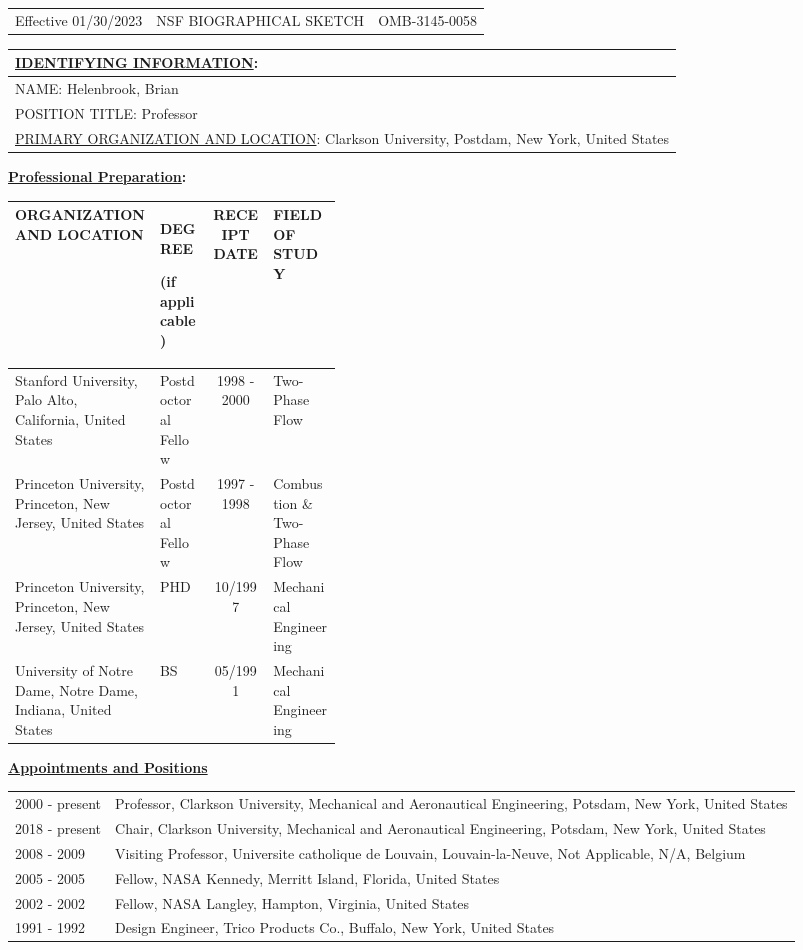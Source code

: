 \documentclass[11pt]{article}
\begin{document}
\begin{tabularx}{\textwidth}{@{\hspace{0pt}}>{\raggedright\arraybackslash}X >{\centering\arraybackslash}X >{\raggedleft\arraybackslash}X}
\tiny Effective 01/30/2023 & \tiny NSF BIOGRAPHICAL SKETCH &\tiny OMB-3145-0058
\end{tabularx}
\vspace{-0.8\baselineskip}
\begin{tabularx}{\linewidth}{@{\hspace{0pt}}X}
{\bf \underline{IDENTIFYING INFORMATION}:} \\ \hline
NAME: Helenbrook, Brian \\ \hline
POSITION TITLE: Professor \\ \hline
\underline{PRIMARY ORGANIZATION AND LOCATION}: Clarkson University, Postdam, New York, United States \\ \hline
\end{tabularx}
\vspace{-0.8\baselineskip}
\noindent
{\bf \underline{Professional Preparation}:}
\vspace{-0.8\baselineskip}
\begin{tabularx}{\linewidth}{Y|P{0.165\linewidth}|c|P{0.213\linewidth}} \hline
\tiny
ORGANIZATION AND LOCATION &  \tiny   \centerline{DEGREE} \centerline{(if applicable)}  & \tiny RECEIPT DATE        &  \tiny FIELD OF STUDY          \\ \hline
Stanford University, Palo Alto, California, United States & Postdoctoral Fellow &  1998 - 2000 & Two-Phase Flow \\
Princeton University, Princeton, New Jersey, United States & Postdoctoral Fellow & 1997 - 1998 & Combustion \& Two- Phase Flow \\
Princeton University, Princeton, New Jersey, United States & PHD & 10/1997 & Mechanical Engineering \\
University of Notre Dame, Notre Dame, Indiana, United States & BS & 05/1991 & Mechanical Engineering \\
\end{tabularx}

\noindent
{\bf \underline{Appointments and Positions}}
\vspace{-0.8\baselineskip}
\begin{tabularx}{\linewidth}{@{\hspace{0pt}}lX}
2000 - present & Professor, Clarkson University, Mechanical and Aeronautical Engineering, Potsdam, New York, United States \\
2018 - present & Chair, Clarkson University, Mechanical and Aeronautical Engineering, Potsdam, New York, United States \\
2008 - 2009 & Visiting Professor, Universite catholique de Louvain, Louvain-la-Neuve, Not Applicable, N/A, Belgium \\
2005 - 2005 & Fellow, NASA Kennedy, Merritt Island, Florida, United States \\
2002 - 2002 & Fellow, NASA Langley, Hampton, Virginia, United States \\
1991 - 1992 & Design Engineer, Trico Products Co., Buffalo, New York, United States 
\end{tabularx}
\end{document}
